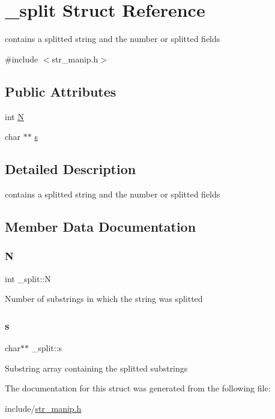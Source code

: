 \hypertarget{struct__split}{}\section{\+\_\+split Struct Reference}
\label{struct__split}


contains a splitted string and the number or splitted fields  




{\ttfamily \#include $<$str\+\_\+manip.\+h$>$}

\subsection*{Public Attributes}
\begin{DoxyCompactItemize}
\item 
int \mbox{\hyperlink{struct__split_af3261bd49762652bb67cc1e76300f582}{N}}
\item 
char $\ast$$\ast$ \mbox{\hyperlink{struct__split_a84d5273295857f35a812eeab15ae607f}{s}}
\end{DoxyCompactItemize}


\subsection{Detailed Description}
contains a splitted string and the number or splitted fields 

\subsection{Member Data Documentation}
\mbox{\label{struct__split_af3261bd49762652bb67cc1e76300f582}} 
\subsubsection{\texorpdfstring{N}{N}}
{\footnotesize\ttfamily int \+\_\+split\+::N}

Number of substrings in which the string was splitted \mbox{\label{struct__split_a84d5273295857f35a812eeab15ae607f}} 
\subsubsection{\texorpdfstring{s}{s}}
{\footnotesize\ttfamily char$\ast$$\ast$ \+\_\+split\+::s}

Substring array containing the splitted substrings 

The documentation for this struct was generated from the following file\+:\begin{DoxyCompactItemize}
\item 
include/\mbox{\hyperlink{str__manip_8h}{str\+\_\+manip.\+h}}\end{DoxyCompactItemize}
